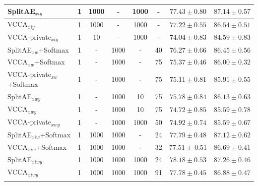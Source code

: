 \begin{table}[h]
{\begin{tabular}{l | c c c c | c | c c}
    {\small SplitAE$_{x i y}$} & 1 & 1000 & - & 1000 &  - & $77.43 \pm 0.80$ & $87.14 \pm 0.57$ \\ \hline    
    {\small VCCA$_{x i y}$} & 1 & 1000 & - & 1000 &  - & $77.22 \pm 0.55$ & $86.54 \pm 0.51$ \\ \hline
    {\small VCCA-private$_{x i y}$} & 1 & 10 & - & 1000 &  - & $74.04 \pm 0.83$ & $84.59 \pm 0.83$ \\      
    \Xhline{2\arrayrulewidth}
    
    {\small SplitAE$_{x w}$+Softmax} & 1 & - & 1000 & - &  40 & $76.27 \pm 0.66$ & $86.45 \pm 0.56$ \\ \hline 
    {\small VCCA$_{x w}$+Softmax} & 1 & - & 1000 & - &  75 & $75.37 \pm 0.46$ & $86.00 \pm 0.32$ \\ \hline 
    {\small VCCA-private$_{x w}$+Softmax} & 1 & - & 1000 & - &  75 & $75.11 \pm 0.81$ & $85.91 \pm 0.55$ \\
    \Xhline{2\arrayrulewidth} 
    
    {\small SplitAE$_{x w y}$} & 1 & - & 1000 & 10 &  75 & $75.78 \pm 0.84$ & $86.13 \pm 0.63$ \\ \hline
    {\small VCCA$_{x w y}$} & 1 & - & 1000 & 10 &  75 & $74.72 \pm 0.85$ & $85.59 \pm 0.78$ \\ \hline
    {\small VCCA-private$_{x w y}$} & 1 & - & 1000 & 1000 & 50 & $74.92 \pm 0.74$ & $85.59 \pm 0.67$ \\       
    \Xhline{2\arrayrulewidth} 
    
    {\small SplitAE$_{x i w}$+Softmax} & 1 & 1000 & 1000 & - &  24 & $77.79 \pm 0.48$ & $87.12 \pm 0.62$ \\
    {\small VCCA$_{x i w}$+Softmax} & 1 & 1000 & 1000 & - &  32 & $77.51 \pm \, 0.51$ & $86.69 \pm 0.41$ \\ \Xhline{2\arrayrulewidth}   
    
    {\small SplitAE$_{x i w y}$} & 1 & 1000 & 1000 & 1000 & 24 & $78.18 \pm 0.53$ & $87.26 \pm 0.46$ \\ 
    {\small VCCA$_{x i w y}$} & 1 & 1000 & 1000 & 1000 &  91 & $77.78 \pm 0.45$ & $86.88 \pm 0.47$ \\ 
    \Xhline{3\arrayrulewidth}
\end{tabular}
}
\vspace{-2mm}
\label{paperB:tab:classification_results_on_test_set_with_hyperparameters}
\end{table}


